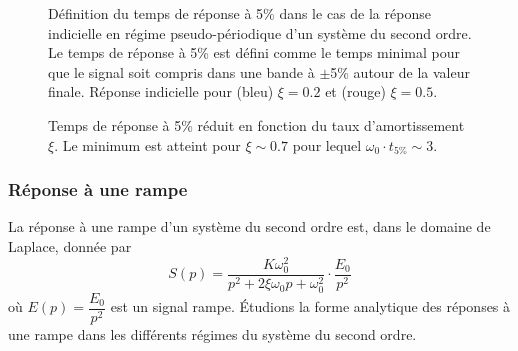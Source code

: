 \begin{figure}[!h]
    \centering
    
    \caption{Définition du temps de réponse à 5\% dans le cas de la 
    réponse indicielle en régime pseudo-périodique d'un système du 
    second ordre. Le temps de réponse à 5\% est défini comme le 
    temps minimal pour que le signal soit compris dans une bande 
    à $\pm$5\% autour de la valeur finale. Réponse indicielle 
    pour (bleu) $\xi=0.2$ et (rouge) $\xi=0.5$.\label{fig-2nd_t5pc} }
\end{figure}
\begin{figure}
\centering
    
    \caption{Temps de réponse à 5\% réduit en fonction du taux 
             d'amortissement $\xi$. Le minimum est atteint pour $\xi\sim0.7$ 
             pour lequel $\omega_0\cdot t_{5\%}\sim3$.
             \label{fig-2nd_temps_reponse}}
\end{figure}
{\tikzset{external/export=false}

}
\subsubsection{Réponse à une rampe}
La réponse à une rampe d'un système du second ordre est, dans le domaine 
de Laplace, donnée par
\[
S(p)=\dfrac{K\omega_0^2}{p^2+2\xi\omega_0p+\omega_0^2}\cdot\dfrac{E_0}{p^2}
\]
où $E(p)=\dfrac{E_0}{p^2}$ est un signal rampe.
\'Etudions la forme analytique des réponses à une rampe dans les différents 
régimes du système du second ordre.
